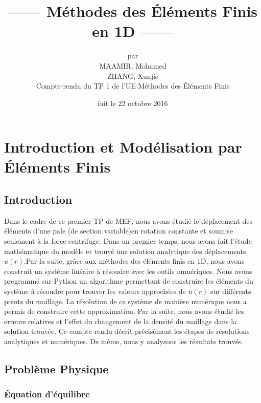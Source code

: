 \documentclass[a4paper,10pt]{report} %
\title{------ Méthodes des Éléments Finis en 1D ------} %
\author{par\\MAAMIR, Mohamed\\ ZHANG, Xunjie\\ Compte-rendu du TP 1 de l'UE Méthodes des Éléments Finis} %
\date{fait le 22 octobre 2016} %
\begin{document}
\maketitle %
\tableofcontents %
\listoffigures %













\chapter{Introduction et Modélisation par Éléments Finis}

\section{Introduction}

Dans le cadre de ce premier TP de MEF, nous avons étudié le déplacement des éléments d'une pale (de section variable)en rotation constante et soumise seulement à la force centrifuge.
Dans un premier temps, nous avons fait l'étude mathématique du modèle et trouvé une solution analytique des déplacements $u(r)$.Par la suite, grâce aux méthodes des éléments finis en 1D, nous avons construit un système linéaire à résoudre avec les outils numériques.
Nous avons programmé sur Python un algorithme permettant de construire les éléments du système à résoudre pour trouver les valeurs approchées de $u(r)$ sur différents points du maillage. La résolution de ce système de manière numérique nous a permis de construire cette approximation.
Par la suite, nous avons étudié les erreurs relatives et l'effet du changement de la densité du maillage dans la solution trouvée.
Ce compte-rendu décrit précisément les étapes de résolutions analytiques et numériques. De même, nous y analysons les résultats trouvés.

\section{Problème Physique}

\subsection{Équation d'équilibre}
\end{document}
